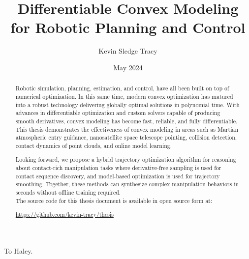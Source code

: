 \documentclass[12pt]{cmuthesis}
\begin{document}
\frontmatter

\pagestyle{empty}

\title{{\bf Differentiable Convex Modeling \\for Robotic Planning and Control}}
\author{Kevin Sledge Tracy}
\date{May 2024}


\support{}
\disclaimer{}


\maketitle

\begin{dedication}
  To Haley.
\end{dedication}

\begin{abstract}
Robotic simulation, planning, estimation, and control, have all been built on top of numerical optimization. In this same time, modern convex optimization has matured into a robust technology delivering globally optimal solutions in polynomial time. With advances in differentiable optimization and custom solvers capable of producing smooth derivatives, convex modeling has become fast, reliable, and fully differentiable. This thesis demonstrates the effectiveness of convex modeling in areas such as Martian atmospheric entry guidance, nanosatellite space telescope pointing, collision detection, contact dynamics of point clouds, and online model learning.

Looking forward, we propose a hybrid trajectory optimization algorithm for reasoning about contact-rich manipulation tasks where derivative-free sampling is used for contact sequence discovery, and model-based optimization is used for trajectory smoothing. Together, these methods can synthesize complex manipulation behaviors in seconds without offline training required. 
 \\

  \noindent
  The source code for this thesis document is available in open source form at:
  \begin{center}
  \url{https://github.com/kevin-tracy/thesis}
  \end{center}
\end{abstract}
\end{document}
